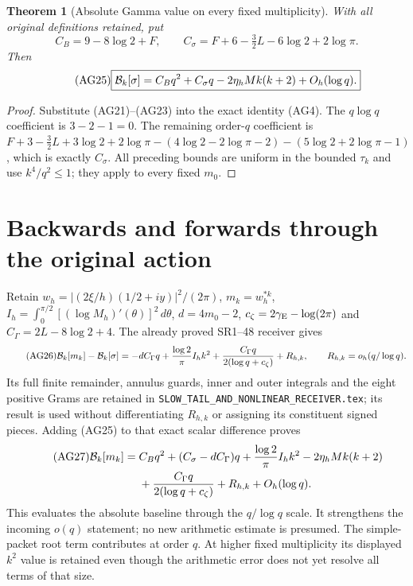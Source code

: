 \documentclass[11pt]{article}
\newtheorem{theorem}{Theorem}\newtheorem{lemma}[theorem]{Lemma}
\newcommand{\dd}{\,d}\newcommand{\Gram}{\operatorname{Gram}}
\begin{document}
\begin{theorem}[Absolute Gamma value on every fixed multiplicity]
With all original definitions retained, put
\begin{equation}\tag{AG24}
 C_B=9-8\log2+F,\qquad
 C_\sigma=F+6-\tfrac32L-6\log2+2\log\pi.
\end{equation}
Then
\begin{equation}\tag{AG25}
 \boxed{\mathcal B_k[\sigma]=C_Bq^2+C_\sigma q
       -2\eta_hM k(k+2)+O_h(\log q).}
\end{equation}
\end{theorem}
\begin{proof}
Substitute (AG21)--(AG23) into the exact identity (AG4).
The $q\log q$ coefficient is $3-2-1=0$.
The remaining order-$q$ coefficient is
$F+3-\tfrac32L+3\log2+2\log\pi
-(4\log2-2\log\pi-2)-(5\log2+2\log\pi-1)$,
which is exactly $C_\sigma$. All preceding bounds are uniform in the
bounded $\tau_k$ and use $k^4/q^2\le1$; they apply to every fixed $m_0$.
\end{proof}

\section{Backwards and forwards through the original action}
Retain $w_h=|(2\xi/h)(1/2+iy)|^2/(2\pi)$, $m_k=w_h^{*k}$,
$I_h=\int_0^{\pi/2}[(\log M_h)'(\theta)]^2\dd\theta$,
$d=4m_0-2$, $c_\zeta=2\gamma_{\rm E}-\log(2\pi)$ and
$C_\Gamma=2L-8\log2+4$. The already proved SR1--48 receiver gives
\begin{equation}\tag{AG26}
 \mathcal B_k[m_k]-\mathcal B_k[\sigma]
 =-dC_\Gamma q+\frac{\log2}{\pi}I_hk^2
  +\frac{C_\Gamma q}{2(\log q+c_\zeta)}+R_{h,k},
 \qquad R_{h,k}=o_h(q/\log q).
\end{equation}
Its full finite remainder, annulus guards, inner and outer integrals and
the eight positive Grams are retained in
\texttt{SLOW\_TAIL\_AND\_NONLINEAR\_RECEIVER.tex}; its result is used
without differentiating $R_{h,k}$ or assigning its constituent signed pieces.
Adding (AG25) to that exact scalar difference proves
\begin{align}\tag{AG27}
 \mathcal B_k[m_k]={}&C_Bq^2+(C_\sigma-dC_\Gamma)q
 +\frac{\log2}{\pi}I_hk^2-2\eta_hMk(k+2)\\
 &+\frac{C_\Gamma q}{2(\log q+c_\zeta)}
 +R_{h,k}+O_h(\log q).\notag
\end{align}
This evaluates the absolute baseline through the $q/\log q$ scale.
It strengthens the incoming $o(q)$ statement; no new arithmetic estimate
is presumed. The simple-packet root term contributes at order $q$.
At higher fixed multiplicity its displayed $k^2$ value is retained even
though the arithmetic error does not yet resolve all terms of that size.
\end{document}
